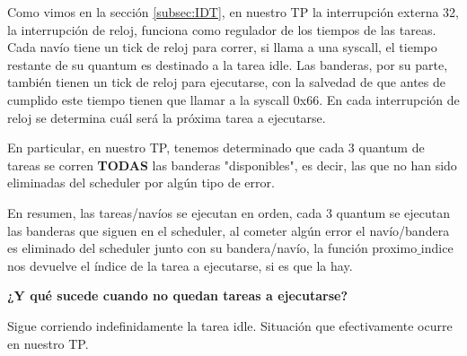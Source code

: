 \par{Como vimos en la sección \ref{subsec:IDT}, en nuestro TP la interrupción externa 32, la interrupción de reloj, funciona como regulador de los tiempos de las tareas. Cada navío tiene un tick de reloj para correr, si llama a una syscall, el tiempo restante de su quantum es destinado a la tarea idle. Las banderas, por su parte, también tienen un tick de reloj para ejecutarse, con la salvedad de que antes de cumplido este tiempo tienen que llamar a la syscall 0x66. En cada interrupción de reloj se determina cuál será la próxima tarea a ejecutarse.}
\par{En particular, en nuestro TP, tenemos determinado que cada 3 quantum de tareas se corren \textbf{TODAS} las banderas "disponibles", es decir, las que no han sido eliminadas del scheduler por algún tipo de error.}
\par{En resumen, las tareas/navíos se ejecutan en orden, cada 3 quantum se ejecutan las banderas que siguen en el scheduler, al cometer algún error el navío/bandera es eliminado del scheduler junto con su bandera/navío, la función proximo$\_$indice nos devuelve el índice de la tarea a ejecutarse, si es que la hay.} 
\medskip
\par{\textbf{¿Y qué sucede cuando no quedan tareas a ejecutarse?}}
\par{Sigue corriendo indefinidamente la tarea idle. Situación que efectivamente ocurre en nuestro TP.}